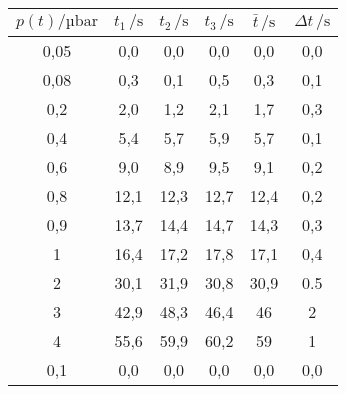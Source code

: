 \begin{table}[htp]
	\begin{center}
		\begin{tabular}{c|ccc|cc}
			\toprule
			{$p(t) /\mathrm{µbar}$} & {$t_1\, /\mathrm{s}$} & {$t_2\, /\mathrm{s}$} & {$t_3\, /\mathrm{s}$} & {$\bar{t}\, /\mathrm{s}$} & {$\Delta t\, /\mathrm{s}$} \\ \midrule
			         0,05           &          0,0          &          0,0          &          0,0          &            0,0            &            0,0             \\
			         0,08           &          0,3          &          0,1          &          0,5          &            0,3            &            0,1             \\
			          0,2           &          2,0          &          1,2          &          2,1          &            1,7            &            0,3             \\
			          0,4           &          5,4          &          5,7          &          5,9          &            5,7            &            0,1             \\
			          0,6           &          9,0          &          8,9          &          9,5          &            9,1            &            0,2             \\
			          0,8           &         12,1          &         12,3          &         12,7          &           12,4            &            0,2             \\
			          0,9           &         13,7          &         14,4          &         14,7          &           14,3            &            0,3             \\
			           1            &         16,4          &         17,2          &         17,8          &           17,1            &            0,4             \\
			           2            &         30,1          &         31,9          &         30,8          &           30,9            &            0.5             \\
			           3            &         42,9          &         48,3          &         46,4          &            46             &             2              \\
			           4            &         55,6          &         59,9          &         60,2          &            59             &             1              \\ \hline
			          0,1           &          0,0          &          0,0          &          0,0          &            0,0            &            0,0             \\

\end{tabular}
\end{center}
\end{table}
